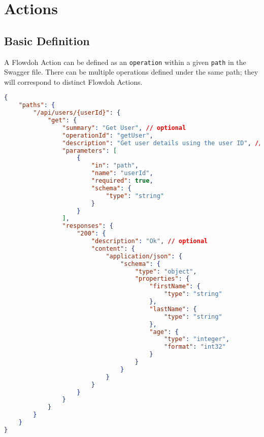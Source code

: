 \section{Actions}
\subsection{Basic Definition}
A Flowdoh Action can be defined as an \texttt{operation} within a given \texttt{path} in the Swagger file. There can be multiple operations defined under the same path; they will correspond to distinct Flowdoh Actions.
\begin{lstlisting}[language=json]
{
    "paths": {
        "/api/users/{userId}": {
            "get": {
                "summary": "Get User", // optional
                "operationId": "getUser",
                "description": "Get user details using the user ID", // optional
                "parameters": [
                    {
                        "in": "path",
                        "name": "userId",
                        "required": true,
                        "schema": {
                            "type": "string"
                        }
                    }
                ],
                "responses": {
                    "200": {
                        "description": "Ok", // optional
                        "content": {
                            "application/json": {
                                "schema": {
                                    "type": "object",
                                    "properties": {
                                        "firstName": {
                                            "type": "string"
                                        },
                                        "lastName": {
                                            "type": "string"
                                        },
                                        "age": {
                                            "type": "integer",
                                            "format": "int32"
                                        }
                                    }
                                }
                            }
                        }
                    }
                }
            }
        }
    }
}
\end{lstlisting}
